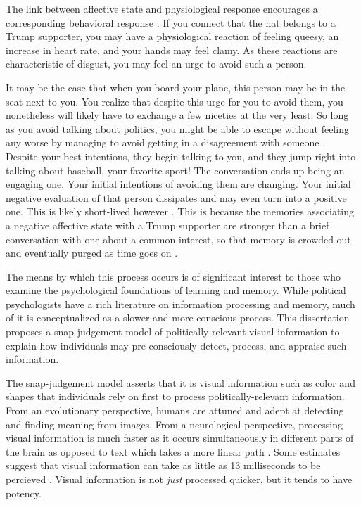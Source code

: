 \documentclass [12pt]{article}
\begin{document}
The link between affective state and physiological response encourages a corresponding behavioral response \citep{valentino_et-al_2011_jop}. If you connect that the hat belongs to a Trump supporter, you may have a physiological reaction of feeling queesy, an increase in heart rate, and your hands may feel clamy. As these reactions are characteristic of disgust, you may feel an urge to avoid such a person. 

It may be the case that when you board your plane, this person may be in the seat next to you. You realize that despite this urge for you to avoid them, you nonetheless will likely have to exchange a few niceties at the very least. So long as you avoid talking about politics, you might be able to escape without feeling any worse by managing to avoid getting in a disagreement with someone \citep{mutz_2006, carlson_settle_2022_oup}. Despite your best intentions, they begin talking to you, and they jump right into talking about baseball, your favorite sport! The conversation ends up being an engaging one. Your initial intentions of avoiding them are changing. Your initial negative evaluation of that person dissipates and may even turn into a positive one. This is likely short-lived however \citep{santoro_broockman_sa}. This is because the memories associating a negative affective state with a Trump supporter are stronger than a brief conversation with one about a common interest, so that memory is crowded out and eventually purged as time goes on \citep{kahana_et-al_2022_ohhum}.

The means by which this process occurs is of significant interest to those who examine the psychological foundations of learning and memory. While political psychologists have a rich literature on information processing and memory, much of it is conceptualized as a slower and more conscious process. This dissertation proposes a snap-judgement model of politically-relevant visual information to explain how individuals may pre-consciously detect, process, and appraise such information. 

The snap-judgement model asserts that it is visual information such as color and shapes that individuals rely on first to process politically-relevant information. From an evolutionary perspective, humans are attuned and adept at detecting and finding meaning from images. From a neurological perspective, processing visual information is much faster as it occurs simultaneously in different parts of the brain as opposed to text which takes a more linear path \citep{vogel_et-al_1986_wp}. Some estimates suggest that visual information can take as little as 13 milliseconds to be percieved \citep{potter_et-al_2014_app}. Visual information is not \textit{just} processed quicker, but it tends to have potency.
\end{document}

